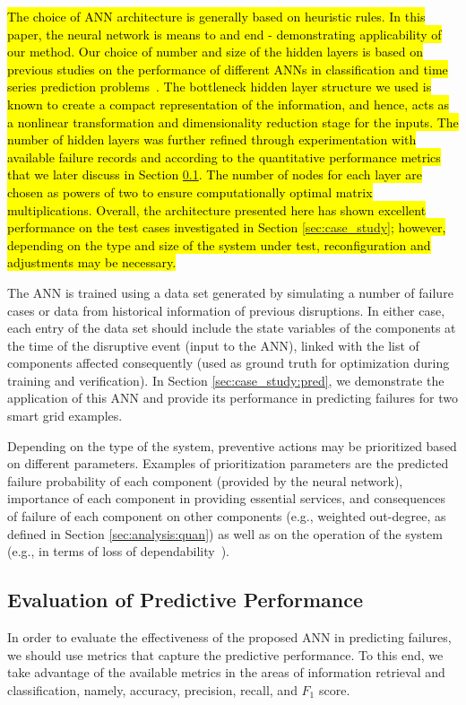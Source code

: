 \documentclass[12pt]{elsarticle}
\begin{document}
\hl{The choice of ANN architecture is generally based on heuristic rules. In this paper, the neural network is means to and end - demonstrating applicability of our method. Our choice of number and size of the hidden layers is based on previous studies on the performance of different ANNs in classification and time series prediction problems~\cite{YuS11}. The bottleneck hidden layer structure we used is known to create a compact representation of the information, and hence, acts as a nonlinear transformation and dimensionality reduction stage for the inputs. The number of hidden layers was further refined  through experimentation with available failure records and according to the quantitative performance metrics that we later discuss in Section \ref{sec:pred:metrics}. The number of nodes for each layer are chosen as powers of two to ensure computationally optimal matrix multiplications. Overall, the architecture presented here has shown excellent performance on the test cases investigated in Section \ref{sec:case_study}; however, depending on the type and size of the system under test, reconfiguration and adjustments may be necessary.}

The ANN is trained using a data set generated by simulating a number of failure cases or data from historical information of previous disruptions. In either case, each entry of the data set should include the state variables of the components at the time of the disruptive event (input to the ANN), linked with the list of components affected consequently (used as ground truth for optimization during training and verification). In Section \ref{sec:case_study:pred}, we demonstrate the application of this ANN and provide its performance in predicting failures for two smart grid examples.

Depending on the type of the system, preventive actions may be prioritized based on different parameters. Examples of prioritization parameters are the predicted failure probability of each component (provided by the neural network), importance of each component in providing essential services, and consequences of failure of each component on other components (e.g., weighted out-degree, as defined in Section \ref{sec:analysis:quan}) as well as on the operation of the system (e.g., in terms of loss of dependability~\cite{WoM20}).

\subsection{Evaluation of Predictive Performance}
\label{sec:pred:metrics}
In order to evaluate the effectiveness of the proposed ANN in predicting failures, we should use metrics that capture the predictive performance. To this end, we take advantage of the available metrics in the areas of information retrieval and classification, namely, accuracy, precision, recall, and $F_1$ score.
\end{document}
